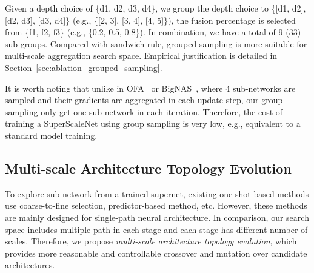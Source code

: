\documentclass[final]{cvpr}
\newcommand{\supernet}{SuperScaleNet\xspace}
\begin{document}
Given a depth choice of \{d1, d2, d3, d4\}, we group the depth choice to \{[d1, d2], [d2, d3], [d3, d4]\} (e.g., \{[2, 3], [3, 4], [4, 5]\}), the fusion percentage is selected from \{f1, f2, f3\}  (e.g., \{0.2, 0.5, 0.8\}). In combination, we have a total of 9 (33) sub-groups.
Compared with sandwich rule, grouped sampling is more suitable for multi-scale aggregation search space. Empirical justification is detailed in Section~\ref{sec:ablation_grouped_sampling}.


It is worth noting that unlike in OFA~\cite{cai2020once} or BigNAS~\cite{yu2020bignas}, where 4 sub-networks are sampled and their gradients are aggregated in each update step, our group sampling only get one sub-network in each iteration. Therefore, the cost of training a \supernet using group sampling is very low, e.g., equivalent to a standard model training. 

\subsection{Multi-scale Architecture Topology Evolution}
\label{sec:topology_evolution}

To explore sub-network from a trained supernet, existing one-shot based methods use coarse-to-fine selection, predictor-based method, etc. 
However, these methods are mainly designed for single-path neural architecture. 
In comparison, our search space includes multiple path in each stage and each stage has different number of scales.
Therefore, we propose \textit{multi-scale architecture topology evolution}, which provides more reasonable and controllable crossover and mutation over candidate architectures.  
\end{document}
